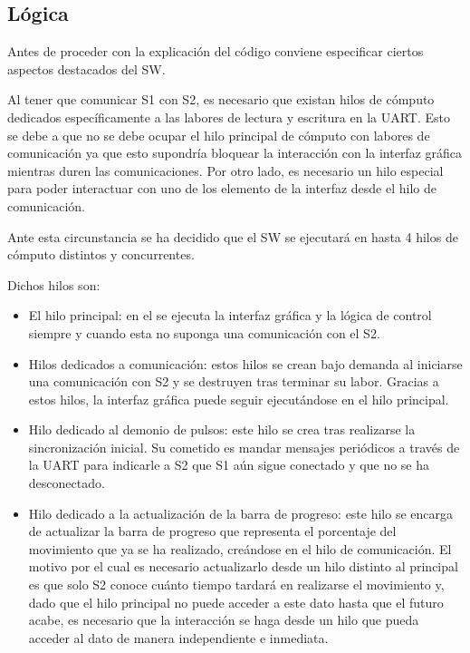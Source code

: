\subsection{Lógica}
Antes de proceder con la explicación del código conviene especificar ciertos aspectos destacados del \ac{SW}.

Al tener que comunicar \ac{S1} con \ac{S2}, es necesario que existan hilos de cómputo dedicados específicamente a las labores de lectura y escritura en la UART. Esto se debe a que no se debe ocupar el hilo principal de cómputo con labores de comunicación ya que esto supondría bloquear la interacción con la interfaz gráfica mientras duren las comunicaciones.
Por otro lado, es necesario un hilo especial para poder interactuar con uno de los elemento de la interfaz desde el hilo de comunicación.

Ante esta circunstancia se ha decidido que el \ac{SW} se ejecutará en hasta 4 hilos de cómputo distintos y concurrentes.

Dichos hilos son:

\begin{itemize}
    \item El hilo principal: en el se ejecuta la interfaz gráfica y la lógica de control siempre y cuando esta no suponga una comunicación con el \ac{S2}.
    \item Hilos dedicados a comunicación: estos hilos se crean bajo demanda al iniciarse una comunicación con \ac{S2} y se destruyen tras terminar su labor. Gracias a estos hilos, la interfaz gráfica puede seguir ejecutándose en el hilo principal.
    \item Hilo dedicado al demonio de pulsos: este hilo se crea tras realizarse la sincronización inicial. Su cometido es mandar mensajes periódicos a través de la UART para indicarle a \ac{S2} que \ac{S1} aún sigue conectado y que no se ha desconectado.
    \item Hilo dedicado a la actualización de la barra de progreso: este hilo se encarga de actualizar la barra de progreso que representa el porcentaje del movimiento que ya se ha realizado, creándose en el hilo de comunicación. El motivo por el cual es necesario actualizarlo desde un hilo distinto al principal es que solo \ac{S2} conoce cuánto tiempo tardará en realizarse el movimiento y, dado que el hilo principal no puede acceder a este dato hasta que el futuro acabe, es necesario que la interacción se haga desde un hilo que pueda acceder al dato de manera independiente e inmediata.
\end{itemize}

